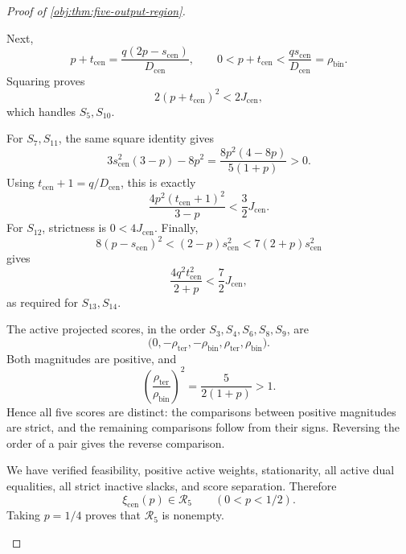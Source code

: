 \begin{proof}[Proof of \cref{obj:thm:five-output-region}]
\begin{enumerate}
Next,
\[
p+t_{\mathrm{cen}}
=\frac{q(2p-s_{\mathrm{cen}})}{D_{\mathrm{cen}}},
\qquad
0<p+t_{\mathrm{cen}}<\frac{qs_{\mathrm{cen}}}{D_{\mathrm{cen}}}
=\rho_{\mathrm{bin}}.
\]
Squaring proves
\[
2(p+t_{\mathrm{cen}})^2<2J_{\mathrm{cen}},
\]
which handles \(S_5,S_{10}\).

For \(S_7,S_{11}\), the same square identity gives
\[
3s_{\mathrm{cen}}^2(3-p)-8p^2
=
\frac{8p^2(4-8p)}{5(1+p)}>0.
\]
Using \(t_{\mathrm{cen}}+1=q/D_{\mathrm{cen}}\), this is exactly
\[
\frac{4p^2(t_{\mathrm{cen}}+1)^2}{3-p}
<
\frac32J_{\mathrm{cen}}.
\]
For \(S_{12}\), strictness is \(0<4J_{\mathrm{cen}}\).
Finally,
\[
8(p-s_{\mathrm{cen}})^2
<
(2-p)s_{\mathrm{cen}}^2
<
7(2+p)s_{\mathrm{cen}}^2
\]
gives
\[
\frac{4q^2t_{\mathrm{cen}}^2}{2+p}
<
\frac72J_{\mathrm{cen}},
\]
as required for \(S_{13},S_{14}\).

The active projected scores, in the order \(S_3,S_4,S_6,S_8,S_9\), are
\[
\bigl(0,-\rho_{\mathrm{ter}},-\rho_{\mathrm{bin}},
          \rho_{\mathrm{ter}},\rho_{\mathrm{bin}}\bigr).
\]
Both magnitudes are positive, and
\[
\left(\frac{\rho_{\mathrm{ter}}}{\rho_{\mathrm{bin}}}\right)^2
=
\frac{5}{2(1+p)}>1.
\]
Hence all five scores are distinct: the comparisons between positive
magnitudes are strict, and the remaining comparisons follow from their
signs. Reversing the order of a pair gives the reverse comparison.

We have verified feasibility, positive active weights, stationarity,
all active dual equalities, all strict inactive slacks, and score
separation. Therefore
\[
\xi_{\mathrm{cen}}(p)\in\mathcal R_5
\qquad(0<p<1/2).
\]
Taking \(p=1/4\) proves that \(\mathcal R_5\) is nonempty.


\end{enumerate}
\end{proof}
